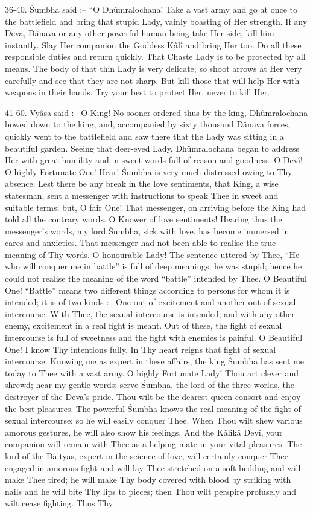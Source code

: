 36-40. \'Sumbha said :-- ``O Dh\^umralochana! Take a vast army and go at once to the battlefield and bring that stupid Lady, vainly boasting of Her strength. If any Deva, D\^anava or any other powerful human being take Her side, kill him instantly. Slay Her companion the Goddess K\^al\^i and bring Her too. Do all these responsible duties and return quickly. That Chaste Lady is to be protected by all means. The body of that thin Lady is very delicate; so shoot arrows at Her very carefully and see that they are not sharp. But kill those that will help Her with weapons in their hands. Try your best to protect Her, never to kill Her.

41-60. Vy\^asa said :-- O King! No sooner ordered thus by the king, Dh\^umralochana bowed down to the king, and, accompanied by sixty thousand D\^anava forces, quickly went to the battlefield and saw there that the Lady was sitting in a beautiful garden. Seeing that deer-eyed Lady, Dh\^umralochana began to address Her with great humility and in sweet words full of reason and goodness. O Dev\^i! O highly Fortunate One! Hear! \'Sumbha is very much distressed owing to Thy absence. Lest there be any break in the love sentiments, that King, a wise statesman, sent a messenger with instructions to speak Thee in sweet and suitable terms; but, O fair One! That messenger, on arriving before the King had told all the contrary words. O Knower of love sentiments! Hearing thus the messenger's words, my lord \'Sumbha, sick with love, has become immersed in cares and anxieties. That messenger had not been able to realise the true meaning of Thy words. O honourable Lady! The sentence uttered by Thee, ``He who will conquer me in battle'' is full of deep meanings; he was stupid; hence he could not realise the meaning of the word ``battle'' intended by Thee. O Beautiful One! ``Battle'' means two different things according to persons for whom it is intended; it is of two kinds :-- One out of excitement and another out of sexual intercourse. With Thee, the sexual intercourse is intended; and with any other enemy, excitement in a real fight is meant. Out of these, the fight of sexual intercourse is full of sweetness and the fight with enemies is painful. O Beautiful One! I know Thy intentions fully. In Thy heart reigns that fight of sexual intercourse. Knowing me as expert in these affairs, the king \'Sumbha has sent me today to Thee with a vast army. O highly Fortunate Lady! Thou art clever and shrewd; hear my gentle words; serve \'Sumbha, the lord of the three worlds, the destroyer of the Deva's pride. Thou wilt be the dearest queen-consort and enjoy the best pleasures. The powerful \'Sumbha knows the real meaning of the fight of sexual intercourse; so he will easily conquer Thee. When Thou wilt shew various amorous gestures, he will also show his feelings. And the K\^alik\^a Dev\^i, your companion will remain with Thee as a helping mate in your vital pleasures. The lord of the Daityas, expert in the science of love, will certainly conquer Thee engaged in amorous fight and will lay Thee stretched on a soft bedding and will make Thee tired; he will make Thy body covered with blood by striking with nails and he will bite Thy lips to pieces; then Thou wilt perspire profusely and wilt cease fighting. Thus Thy 